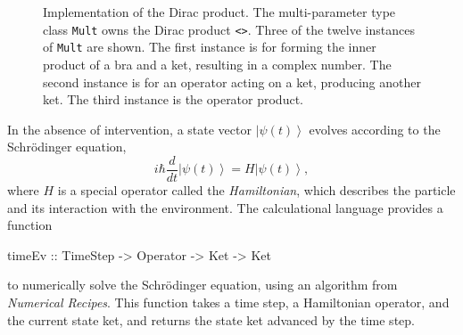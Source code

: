 \documentclass{eptcs}
\newcommand{\KeywordTok}[1]{\textcolor[rgb]{0.00,0.44,0.13}{\textbf{{#1}}}}
\newcommand{\DataTypeTok}[1]{\textcolor[rgb]{0.56,0.13,0.00}{{#1}}}
\newcommand{\SpecialCharTok}[1]{\textcolor[rgb]{0.25,0.44,0.63}{{#1}}}
\newcommand{\FunctionTok}[1]{\textcolor[rgb]{0.02,0.16,0.49}{{#1}}}
\newcommand{\OperatorTok}[1]{\textcolor[rgb]{0.40,0.40,0.40}{{#1}}}
\newcommand{\NormalTok}[1]{{#1}}
\newcommand{\ket}[1]{\left| #1 \right\rangle}
\begin{document}
\begin{figure}
\caption{Implementation of the Dirac product.  The multi-parameter type class \DataTypeTok{\texttt{Mult}}
  owns the Dirac product \OperatorTok{\texttt{<>}}.  Three of the twelve instances of \DataTypeTok{\texttt{Mult}}
  are shown.  The first instance is for forming the inner product of a bra and a ket,
  resulting in a complex number.
  The second instance is for an operator acting on a ket, producing another ket.
  The third instance is the operator product.
  }
\label{impdirac}
\end{figure}

In the absence of intervention, a state vector $\ket{\psi(t)}$ evolves according to the
Schr\"odinger equation,
\[
i \hbar \frac{d}{dt} \ket{\psi(t)} = H \ket{\psi(t)} ,
\]
where $H$ is a special operator called the \emph{Hamiltonian},
which describes the particle
and its interaction with the environment.
The calculational language provides a function
\begin{Highlighting}[]
\FunctionTok{timeEv} \SpecialCharTok{::} \DataTypeTok{TimeStep} \SpecialCharTok{->} \DataTypeTok{Operator} \SpecialCharTok{->} \DataTypeTok{Ket} \SpecialCharTok{->} \DataTypeTok{Ket}
\end{Highlighting}
to numerically solve the Schr\"odinger equation, using an algorithm
from \emph{Numerical Recipes}\cite{numericalrecipes}.
This function takes a time step, a Hamiltonian operator, and the current
state ket, and returns the state ket advanced by the time step.
\end{document}
